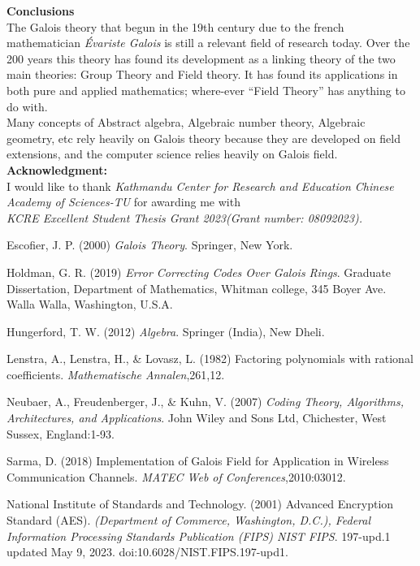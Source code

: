 \documentclass[11pt]{amsart}
\theoremstyle{plain}
\theoremstyle{definition}
\numberwithin{equation}{section}
\begin{document}
\textbf{Conclusions}\\
The Galois theory that begun in the 19th century due to the french mathematician \textit{Évariste Galois} is still a relevant field of research today. Over the 200 years this theory has found its development as a linking theory of the two main theories: Group Theory and Field theory. It has found its applications in both pure and applied mathematics; where-ever ``Field Theory'' has anything to do with.\\
Many concepts of Abstract algebra, Algebraic number theory, Algebraic geometry, etc rely heavily on Galois theory because they are developed on field extensions, and the computer science relies heavily on Galois field.\\


\vspace{3mm}
\textbf{Acknowledgment:} \\
I would like to thank \textit{Kathmandu Center for Research and Education Chinese Academy of Sciences-TU} for awarding me with \\
\textit{KCRE Excellent Student Thesis Grant 2023(Grant number: 08092023).}
\vspace{7mm}

\begin{thebibliography}{9}
Escofier, J. P. (2000) \emph{Galois Theory}. Springer, New York.

Holdman, G. R. (2019) \emph{Error Correcting Codes  Over Galois Rings}. Graduate Dissertation, Department of Mathematics, Whitman college, 345 Boyer Ave.
Walla Walla, Washington, U.S.A.

Hungerford, T. W. (2012) \emph{Algebra}. Springer (India), New Dheli.

Lenstra, A., Lenstra, H.,  \& Lovasz, L. (1982)  Factoring polynomials with rational coefficients. \emph{Mathematische Annalen},261,12.

Neubaer, A.,  Freudenberger, J.,  \& Kuhn, V. (2007) \emph{Coding Theory, Algorithms, Architectures, and Applications}. John Wiley and Sons Ltd, Chichester, West Sussex, England:1-93.

Sarma, D. (2018) Implementation of Galois Field for Application in Wireless Communication Channels. \emph{MATEC Web of Conferences},2010:03012.

National Institute of Standards and Technology. (2001) Advanced Encryption
Standard (AES). \emph{(Department of Commerce, Washington, D.C.), Federal Information Processing Standards Publication (FIPS) NIST FIPS}. 197-upd.1 updated May 9, 2023. doi:10.6028/NIST.FIPS.197-upd1.
\end{thebibliography}
\end{document}

